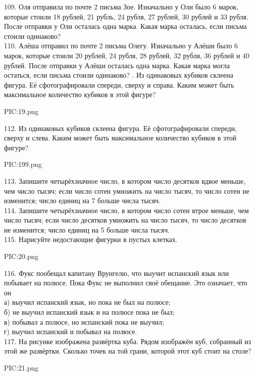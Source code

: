 109. Оля отправила по почте 2 письма Зое. Изначально у Оли было 6 марок, которые стоили 18 рублей, 21 рубль, 24 рубля, 27 рублей, 30 рублей и 33 рубля. После отправки у Оли осталась одна марка. Какая марка осталась, если письма стоили одинаково?\\
110. Алёша отправил по почте 2 письма Олегу. Изначально у Алёши было 6 марок, которые стоили 20 рублей, 24 рубля, 28 рублей, 32 рубля, 36 рублей и 40 рублей. После отправки у Алёши осталась одна марка. Какая марка могла остаться, если письма стоили одинаково?
\newpage
{}. Из одинаковых кубиков склеена фигура. Её сфотографировали спереди, сверху и справа. Каким может быть максимальное количество кубиков в этой фигуре?
\begin{center}
{{PIC:19.png}}
\end{center}
112. Из одинаковых кубиков склеена фигура. Её сфотографировали спереди, сверху и слева. Каким может быть максимальное количество кубиков в этой фигуре?
\begin{center}
{{PIC:199.png}}
\end{center}
113. Запишите четырёхзначное число, в котором число десятков вдвое меньше, чем число тысяч; если число сотен умножить на число тысяч, то число сотен не изменится; число единиц на 7 больше числа тысяч.\\
114. Запишите четырёхзначное число, в котором число сотен втрое меньше, чем число тысяч; если число десятков умножить на число тысяч, то число десятков не изменится; число единиц на 5 больше числа тысяч.\\
115. Нарисуйте недостающие фигурки в пустых клетках.
\begin{center}
{{PIC:20.png}}
\end{center}
116. Фукс пообещал капитану Врунгелю, что выучит испанский язык или побывает на полюсе. Пока Фукс не выполнил своё обещание. Это означает, что он\\
а) выучил испанский язык, но пока не был на полюсе;\\
б) не выучил испанский язык и на полюсе пока не был;\\
в) побывал а полюсе, но испанский пока не выучил;\\
г) выучил испанский и побывал на полюсе.\\
117. На рисунке изображена развёртка куба. Рядом изображён куб, собранный из этой же развёртки. Сколько точек на той грани, которой этот куб стоит на столе?
\begin{center}
{{PIC:21.png}}
\end{center}
